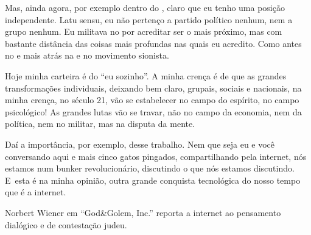  

Mas, ainda agora, por exemplo dentro do , claro que eu tenho uma
posição independente. Latu sensu, eu não pertenço a partido político
nenhum, nem a grupo nenhum. Eu militava no  por acreditar ser o mais
próximo, mas com bastante distância das coisas mais profundas nas quais
eu acredito. Como antes no  e mais atrás na  e no movimento
sionista.

Hoje minha carteira é do ``eu sozinho''. A minha crença é de que as
grandes transformações individuais, deixando bem claro, grupais, sociais
e nacionais, na minha crença, no século 21, vão se estabelecer no campo
do espírito, no campo psicológico! As grandes lutas vão se travar, não
no campo da economia, nem da política, nem no militar, mas na disputa da
mente.

 

Daí a importância, por exemplo, desse trabalho. Nem que seja eu e você
conversando aqui e mais cinco gatos pingados, compartilhando pela
internet, nós estamos num bunker revolucionário, discutindo o que nós
estamos discutindo. E~esta é na minha opinião, outra grande conquista
tecnológica do nosso tempo que é a internet.

 

Norbert Wiener em ``God\&Golem, Inc.'' reporta a internet ao pensamento
dialógico e de contestação judeu.%

\fechafala
